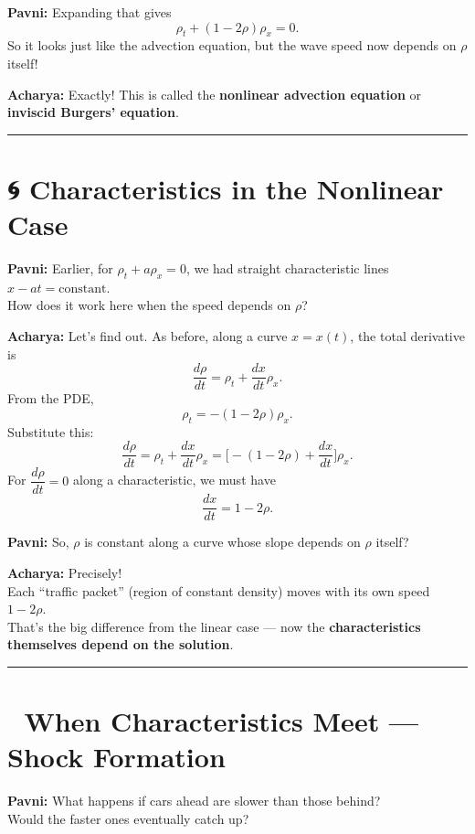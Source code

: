 \documentclass[
  letterpaper,
]{book}
\begin{document}
\textbf{Pavni:} Expanding that gives \[
\rho_t + (1 - 2\rho)\rho_x = 0.
\] So it looks just like the advection equation, but the wave speed now
depends on \(\rho\) itself!

\textbf{Acharya:} Exactly! This is called the \textbf{nonlinear
advection equation} or \textbf{inviscid Burgers' equation}.

\begin{center}\rule{0.5\linewidth}{0.5pt}\end{center}

\section{🌀 Characteristics in the Nonlinear
Case}\label{characteristics-in-the-nonlinear-case}

\textbf{Pavni:} Earlier, for \(\rho_t + a\rho_x = 0\), we had straight
characteristic lines \(x - at = \text{constant}\).\\
How does it work here when the speed depends on \(\rho\)?

\textbf{Acharya:} Let's find out. As before, along a curve \(x = x(t)\),
the total derivative is \[
\frac{d\rho}{dt} = \rho_t + \frac{dx}{dt}\rho_x.
\] From the PDE, \[
\rho_t = -(1 - 2\rho)\rho_x.
\] Substitute this: \[
\frac{d\rho}{dt} = \rho_t + \frac{dx}{dt}\rho_x = \big[-(1 - 2\rho) + \frac{dx}{dt}\big]\rho_x.
\] For \(\dfrac{d\rho}{dt}=0\) along a characteristic, we must have \[
\frac{dx}{dt} = 1 - 2\rho.
\]

\textbf{Pavni:} So, \(\rho\) is constant along a curve whose slope
depends on \(\rho\) itself?

\textbf{Acharya:} Precisely!\\
Each ``traffic packet'' (region of constant density) moves with its own
speed \(1 - 2\rho\).\\
That's the big difference from the linear case --- now the
\textbf{characteristics themselves depend on the solution}.

\begin{center}\rule{0.5\linewidth}{0.5pt}\end{center}

\section{🚗 When Characteristics Meet --- Shock
Formation}\label{when-characteristics-meet-shock-formation}

\textbf{Pavni:} What happens if cars ahead are slower than those
behind?\\
Would the faster ones eventually catch up?
\end{document}
